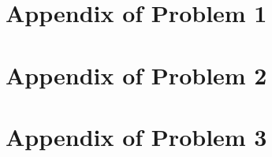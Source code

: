 \chapter{Appendix of Problem 1}\label{app:1-problem}

\chapter{Appendix of Problem 2}\label{app:2-problem}

\chapter{Appendix of Problem 3}\label{app:3-problem}
